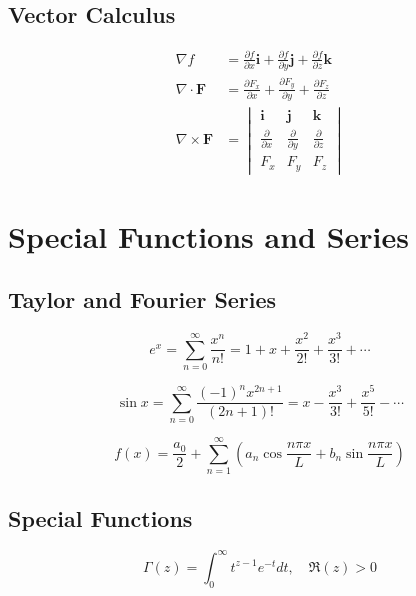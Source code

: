 \documentclass[11pt]{article}
\begin{document}
\subsection{Vector Calculus}
\begin{align}
\nabla f &= \frac{\partial f}{\partial x}\mathbf{i} + \frac{\partial f}{\partial y}\mathbf{j} + \frac{\partial f}{\partial z}\mathbf{k} \\
\nabla \cdot \mathbf{F} &= \frac{\partial F_x}{\partial x} + \frac{\partial F_y}{\partial y} + \frac{\partial F_z}{\partial z} \\
\nabla \times \mathbf{F} &= \begin{vmatrix}
\mathbf{i} & \mathbf{j} & \mathbf{k} \\
\frac{\partial}{\partial x} & \frac{\partial}{\partial y} & \frac{\partial}{\partial z} \\
F_x & F_y & F_z
\end{vmatrix}
\end{align}

\section{Special Functions and Series}

\subsection{Taylor and Fourier Series}
\begin{equation}
e^x = \sum_{n=0}^{\infty} \frac{x^n}{n!} = 1 + x + \frac{x^2}{2!} + \frac{x^3}{3!} + \cdots
\end{equation}

\begin{equation}
\sin x = \sum_{n=0}^{\infty} \frac{(-1)^n x^{2n+1}}{(2n+1)!} = x - \frac{x^3}{3!} + \frac{x^5}{5!} - \cdots
\end{equation}

\begin{equation}
f(x) = \frac{a_0}{2} + \sum_{n=1}^{\infty} \left(a_n \cos\frac{n\pi x}{L} + b_n \sin\frac{n\pi x}{L}\right)
\end{equation}

\subsection{Special Functions}
\begin{equation}
\Gamma(z) = \int_0^{\infty} t^{z-1} e^{-t} dt, \quad \Re(z) > 0
\end{equation}
\end{document}
